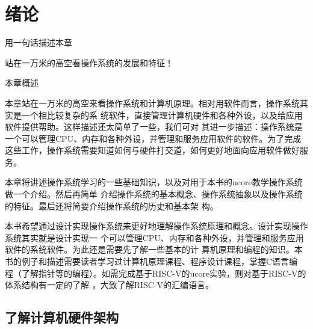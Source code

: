 
\chapter{绪论}\label{ch_intro}

用一句话描述本章

站在一万米的高空看操作系统的发展和特征！

本章概述

本章站在一万米的高空来看操作系统和计算机原理。相对用软件而言，操作系统其实是一个相比较复杂的系
统软件，直接管理计算机硬件和各种外设，以及给应用软件提供帮助。这样描述还太简单了一些，我们可对
其进一步描述：操作系统是一个可以管理CPU、内存和各种外设，并管理和服务应用软件的软件。为了完成
这些工作，操作系统需要知道如何与硬件打交道，如何更好地面向应用软件做好服务。

本章将讲述操作系统学习的一些基础知识，以及对用于本书的ucore教学操作系统做一个介绍。然后再简单
介绍操作系统的基本概念、操作系统抽象以及操作系统的特征。最后还将简要介绍操作系统的历史和基本架
构。

本书希望通过设计实现操作系统来更好地理解操作系统原理和概念。设计实现操作系统其实就是设计实现一
个可以管理CPU、内存和各种外设，并管理和服务应用软件的系统软件。为此还是需要先了解一些基本的计
算机原理和编程的知识。本书的例子和描述需要读者学习过计算机原理课程、程序设计课程，掌握C语言编
程（了解指针等的编程）。如需完成基于RISC-V的ucore实验，则对基于RISC-V的体系结构有一定的了解
，大致了解RISC-V的汇编语言。


\section{了解计算机硬件架构}
